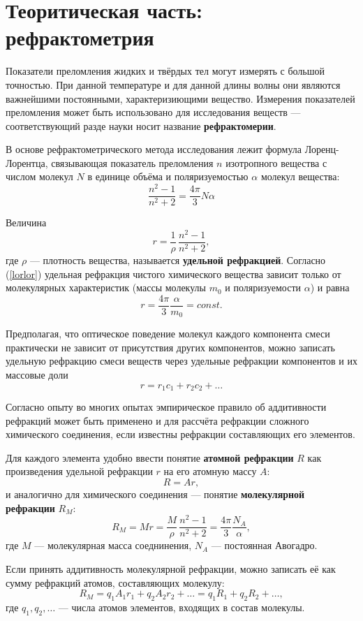 \documentclass[12pt]{article}
\begin{document}
\section*{Теоритическая часть: рефрактометрия}
\par
	Показатели преломления жидких и твёрдых тел могут измерять с большой точностью. При данной температуре и для данной длины волны они являются важнейшими постоянными, характеризиющими вещество. Измерения показателей преломления может быть использовано для исследования веществ --- соответствующий разде науки носит название {\bf рефрактомерии}.
\par
	В основе рефрактометрического метода исследования лежит формула Лоренц-Лорентца, связывающая показатель преломления $n$ изотропного вещества с числом молекул $N$ в единице объёма и поляризуемостью $\alpha$ молекул вещества:
\begin{equation}
	\frac{n^2 - 1}{n^2 + 2} = \frac{4 \pi}{3} N \alpha \label{lorlor}
\end{equation}
\par
	Величина
\begin{equation}
	r = \frac{1}{\rho} \, \frac{n^2 - 1}{n^2 + 2},
\end{equation}
	где $\rho$ --- плотность вещества, называется {\bf удельной рефракцией}. Согласно (\ref{lorlor}) удельная рефракция чистого химического вещества зависит только от молекулярных характеристик (массы молекулы $m_0$ и поляризуемости $\alpha$) и равна
\[
	r = \frac{4 \pi}{3} \frac{\alpha}{m_0} = const.
\]
\par
	Предполагая, что оптическое поведение молекул каждого компонента смеси практически не зависит от присутствия других компонентов, можно записать удельную рефракцию смеси веществ через удельные рефракции компонентов и их массовые доли
\begin{equation}
	r = r_1 c_1 + r_2 c_2 + \dots
\end{equation}
\par
	Согласно опыту во многих опытах эмпирическое правило об аддитивности рефракций может быть применено и для рассчёта рефракции сложного химического соединения, если известны рефракции составляющих его элементов.
\par
	Для каждого элемента удобно ввести понятие {\bf атомной рефракции} $R$ как произведения удельной рефракции $r$ на его атомную массу $A$:
\[
	R = A r,
\]
и аналогично для химического соединения --- понятие {\bf молекулярной рефракции} $R_M$:
\begin{equation}
	R_M = M r = \frac{M}{\rho} \, \frac{n^2 - 1}{n^2 + 2} = \frac{4 \pi}{3} \frac{N_A}{\alpha}, \label{MM}
\end{equation}
где $M$ --- молекулярная масса соеднинения, $N_A$ --- постоянная Авогадро.
\par
	Если принять аддитивность молекулярной рефракции, можно записать её как сумму рефракций атомов, составляющих молекулу:
\[
	R_M = q_1 A_1 r_1 + q_2 A_2 r_2 + \dots = q_1 R_1 + q_2 R_2 + \dots ,
\]
где $q_1, q_2, \dots$ --- числа атомов элементов, входящих в состав молекулы.
\end{document}
